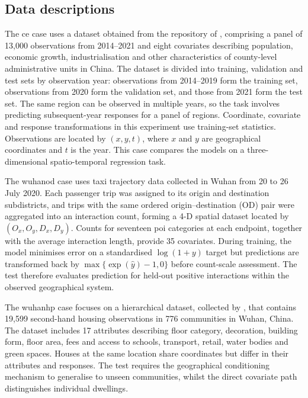 \documentclass[]{interact}
\newcommand{\COO}{\gls{ce}\xspace}
\newcommand{\WuhanOD}{\gls{wuhanod}\xspace}
\newcommand{\WuhanHP}{\gls{wuhanhp}\xspace}
\begin{document}
\subsection{Data descriptions}

The \COO case uses a dataset obtained from the repository of \citet{WuDu-2026}, comprising a panel of 13,000 observations from 2014--2021 and eight covariates describing population, economic growth, industrialisation and other characteristics of county-level administrative units in China.
The dataset is divided into training, validation and test sets by observation year:
observations from 2014--2019 form the training set,
observations from 2020 form the validation set, and those from 2021 form the test set.
The same region can be observed in multiple years,
so the task involves predicting subsequent-year responses for a panel of regions.
Coordinate, covariate and response transformations in this experiment use training-set statistics.
Observations are located by $(x,y,t)$, where $x$ and $y$ are geographical coordinates and $t$ is the year.
This case compares the models on a three-dimensional spatio-temporal regression task.

The \WuhanOD case uses taxi trajectory data collected in Wuhan from 20 to 26 July 2020.
Each passenger trip was assigned to its origin and destination subdistricts, and trips with the same ordered origin--destination (OD) pair were aggregated into an interaction count, forming a 4-D spatial dataset located by $(O_x,O_y,D_x,D_y)$.
Counts for seventeen \gls{poi} categories at each endpoint, together with the average interaction length, provide 35 covariates.
During training, the model minimises error on a standardised $\log(1+y)$ target but
predictions are transformed back by $\max\{\exp(\hat y)-1,0\}$ before count-scale assessment.
The test therefore evaluates prediction for held-out positive interactions within the observed geographical system.

The \WuhanHP case focuses on a hierarchical dataset, collected by \citet{HuHarris-2026}, that contains 19,599 second-hand housing observations in 776 communities in Wuhan, China.
The dataset includes 17 attributes describing floor category, decoration, building form, floor area,
fees and access to schools, transport, retail, water bodies and green spaces.
Houses at the same location share coordinates but differ in their attributes and responses.
The test requires the geographical conditioning mechanism to generalise to unseen communities,
whilst the direct covariate path distinguishes individual dwellings.
\end{document}

